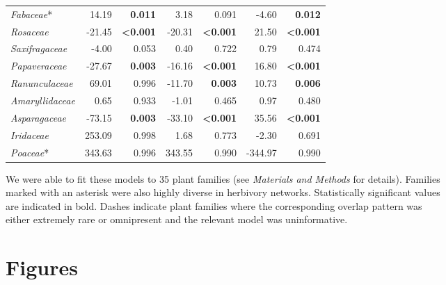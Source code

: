 \documentclass[12pt]{article}
\begin{document}
\begin{table}[!h]
\begin{tabular}{|l  rrr rrr|}
    \emph{Fabaceae}*        &  14.19 & \textbf{0.011}          &    3.18 & 0.091                   &  -4.60 & \textbf{0.012} \\
    \emph{Rosaceae}         & -21.45 & \textbf{\textless0.001} &  -20.31 & \textbf{\textless0.001} &  21.50 & \textbf{\textless0.001} \\
    \emph{Saxifragaceae}    &  -4.00 & 0.053                   &    0.40 & 0.722                   &   0.79 & 0.474 \\
    \emph{Papaveraceae}     & -27.67 & \textbf{0.003}          &  -16.16 & \textbf{\textless0.001} &  16.80 & \textbf{\textless0.001} \\
    \emph{Ranunculaceae}    &  69.01 & 0.996                   &  -11.70 & \textbf{0.003}          &  10.73 & \textbf{0.006} \\
    \emph{Amaryllidaceae}   &   0.65 & 0.933                   &   -1.01 & 0.465                   &   0.97 & 0.480 \\
    \emph{Asparagaceae}     & -73.15 & \textbf{0.003}          &  -33.10 & \textbf{\textless0.001} &  35.56 & \textbf{\textless0.001} \\
    \emph{Iridaceae}        & 253.09 & 0.998                   &    1.68 & 0.773                   &  -2.30 & 0.691 \\
    \emph{Poaceae}*         & 343.63 & 0.996                   &  343.55 & 0.990                   &-344.97 & 0.990 \\
  \hline
  \end{tabular}
  \smallskip
  \footnotesize

    We were able to fit these models to 35 plant families (see \emph{Materials and Methods} for     details). 
    Families \\ marked with an asterisk were also highly diverse in herbivory networks. 
    Statistically significant values \\ are indicated in bold. Dashes indicate 
    plant families where the corresponding overlap 
    pattern was\\either extremely rare or omnipresent and the relevant model was uninformative. 

    \end{table}

\clearpage

\section*{Figures}
\end{document}
